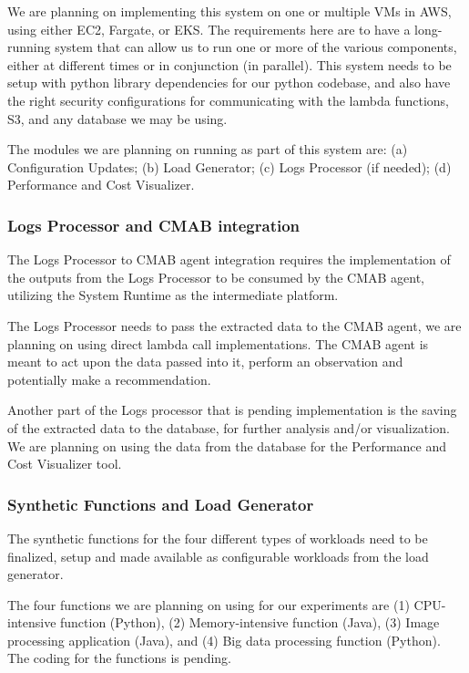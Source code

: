 \documentclass[conference]{IEEEtran}
\begin{document}
We are planning on implementing this system on one or multiple VMs in AWS, using either EC2, Fargate, or EKS. The requirements here are to have a long-running system that can allow us to run one or more of the various components, either at different times or in conjunction (in parallel). This system needs to be setup with python library dependencies for our python codebase, and also have the right security configurations for communicating with the lambda functions, S3, and any database we may be using.

The modules we are planning on running as part of this system are: (a) Configuration Updates; (b) Load Generator; (c) Logs Processor (if needed); (d) Performance and Cost Visualizer.

\subsubsection{Logs Processor and CMAB integration}

The Logs Processor to CMAB agent integration requires the implementation of the outputs from the Logs Processor to be consumed by the CMAB agent, utilizing the System Runtime as the intermediate platform.

The Logs Processor needs to pass the extracted data to the CMAB agent, we are planning on using direct lambda call implementations. The CMAB agent is meant to act upon the data passed into it, perform an observation and potentially make a recommendation.

Another part of the Logs processor that is pending implementation is the saving of the extracted data to the database, for further analysis and/or visualization. We are planning on using the data from the database for the Performance and Cost Visualizer tool.

\subsubsection{Synthetic Functions and Load Generator}

The synthetic functions for the four different types of workloads need to be finalized, setup and made available as configurable workloads from the load generator.

The four functions we are planning on using for our experiments are (1) CPU-intensive function (Python), (2) Memory-intensive function (Java), (3) Image processing application (Java), and (4) Big data processing function (Python). The coding for the functions is pending.
\end{document}
